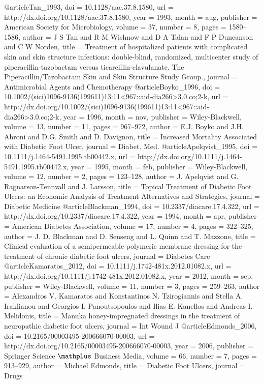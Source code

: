 @article{Tan_1993,
	doi = {10.1128/aac.37.8.1580},
	url = {http://dx.doi.org/10.1128/aac.37.8.1580},
	year = 1993,
	month = {aug},
	publisher = {American Society for Microbiology},
	volume = {37},
	number = {8},
	pages = {1580--1586},
	author = {J S Tan and R M Wishnow and D A Talan and F P Duncanson and C W Norden},
	title = {Treatment of hospitalized patients with complicated skin and skin structure infections: double-blind, randomized, multicenter study of piperacillin-tazobactam versus ticarcillin-clavulanate. The Piperacillin/Tazobactam Skin and Skin Structure Study Group.},
	journal = {Antimicrobial Agents and Chemotherapy}
}
@article{Boyko_1996,
	doi = {10.1002/(sici)1096-9136(199611)13:11<967::aid-dia266>3.0.co;2-k},
	url = {http://dx.doi.org/10.1002/(sici)1096-9136(199611)13:11<967::aid-dia266>3.0.co;2-k},
	year = 1996,
	month = {nov},
	publisher = {Wiley-Blackwell},
	volume = {13},
	number = {11},
	pages = {967--972},
	author = {E.J. Boyko and J.H. Ahroni and D.G. Smith and D. Davignon},
	title = {Increased Mortality Associated with Diabetic Foot Ulcer},
	journal = {Diabet. Med.}
}
@article{Apelqvist_1995,
	doi = {10.1111/j.1464-5491.1995.tb00442.x},
	url = {http://dx.doi.org/10.1111/j.1464-5491.1995.tb00442.x},
	year = 1995,
	month = {feb},
	publisher = {Wiley-Blackwell},
	volume = {12},
	number = {2},
	pages = {123--128},
	author = {J. Apelqvist and G. Ragnarson-Tennvall and J. Larsson},
	title = {Topical Treatment of Diabetic Foot Ulcers: an Economic Analysis of Treatment Alternatives and Strategies},
	journal = {Diabetic Medicine}
}
@article{Blackman_1994,
	doi = {10.2337/diacare.17.4.322},
	url = {http://dx.doi.org/10.2337/diacare.17.4.322},
	year = 1994,
	month = {apr},
	publisher = {American Diabetes Association},
	volume = {17},
	number = {4},
	pages = {322--325},
	author = {J. D. Blackman and D. Senseng and L. Quinn and T. Mazzone},
	title = {Clinical evaluation of a semipermeable polymeric membrane dressing for the treatment of chronic diabetic foot ulcers},
	journal = {Diabetes Care}
}
@article{Kamaratos_2012,
	doi = {10.1111/j.1742-481x.2012.01082.x},
	url = {http://dx.doi.org/10.1111/j.1742-481x.2012.01082.x},
	year = 2012,
	month = {sep},
	publisher = {Wiley-Blackwell},
	volume = {11},
	number = {3},
	pages = {259--263},
	author = {Alexandros V. Kamaratos and Konstantinos N. Tzirogiannis and Stella A. Iraklianou and Georgios I. Panoutsopoulos and Ilias E. Kanellos and Andreas I. Melidonis},
	title = {Manuka honey-impregnated dressings in the treatment of neuropathic diabetic foot ulcers},
	journal = {Int Wound J}
}
@article{Edmonds_2006,
	doi = {10.2165/00003495-200666070-00003},
	url = {http://dx.doi.org/10.2165/00003495-200666070-00003},
	year = 2006,
	publisher = {Springer Science $\mathplus$ Business Media},
	volume = {66},
	number = {7},
	pages = {913--929},
	author = {Michael Edmonds},
	title = {Diabetic Foot Ulcers},
	journal = {Drugs}
}
